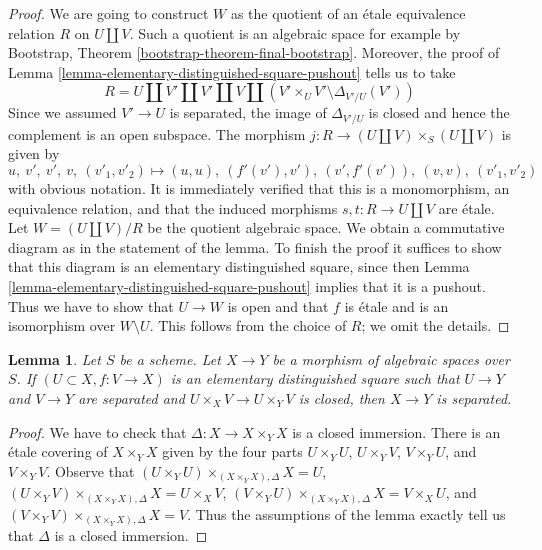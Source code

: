 \documentclass[10pt,a4paper]{amsart}
\theoremstyle{plain}
\newtheorem{lemma}[subsection]{Lemma}
\theoremstyle{definition}
\theoremstyle{remark}
\numberwithin{equation}{subsection}
\begin{document}
\begin{proof}
We are going to construct $W$ as the quotient of an \'etale
equivalence relation $R$ on $U \amalg V$. Such a quotient is an
algebraic space for example by
Bootstrap, Theorem \ref{bootstrap-theorem-final-bootstrap}.
Moreover, the proof of
Lemma \ref{lemma-elementary-distinguished-square-pushout} tells us to take
$$
R = U \amalg V' \amalg V' \amalg V \amalg
(V' \times_U V' \setminus \Delta_{V'/U}(V'))
$$
Since we assumed $V' \to U$ is separated, the image of
$\Delta_{V'/U}$ is closed and hence the complement is an
open subspace. The morphism $j : R \to (U \amalg V) \times_S (U \amalg V)$
is given by
$$
u,\ v',\ v',\ v,\ (v'_1, v'_2) \mapsto
(u, u),\ (f'(v'), v'),\ (v', f'(v')),\ (v, v),\ (v'_1, v'_2)
$$
with obvious notation. It is immediately verified that this is a
monomorphism, an equivalence relation, and that the induced morphisms
$s, t : R \to U \amalg V$ are \'etale. Let
$W = (U \amalg V)/R$ be the quotient algebraic space.
We obtain a commutative diagram as in the statement of the lemma.
To finish the proof it suffices to show that this diagram is
an elementary distinguished square, since then
Lemma \ref{lemma-elementary-distinguished-square-pushout}
implies that it is a pushout.
Thus we have to show that $U \to W$ is open and that
$f$ is \'etale and is an isomorphism over $W \setminus U$.
This follows from the choice of $R$; we omit the details.
\end{proof}

\begin{lemma}
\label{lemma-check-separated}
Let $S$ be a scheme. Let $X \to Y$ be a morphism of algebraic spaces over $S$.
If $(U \subset X, f : V \to X)$ is an elementary distinguished square
such that $U \to Y$ and $V \to Y$ are separated and
$U \times_X V \to U \times_Y V$ is closed, then $X \to Y$ is separated.
\end{lemma}

\begin{proof}
We have to check that $\Delta : X \to X \times_Y X$ is a closed immersion.
There is an \'etale covering of $X \times_Y X$ given by the four parts
$U \times_Y U$, $U \times_Y V$, $V \times_Y U$, and $V \times_Y V$.
Observe that
$(U \times_Y U) \times_{(X \times_Y X), \Delta} X  = U$,
$(U \times_Y V) \times_{(X \times_Y X), \Delta} X = U \times_X V$,
$(V \times_Y U) \times_{(X \times_Y X), \Delta} X = V \times_X U$, and
$(V \times_Y V) \times_{(X \times_Y X), \Delta} X = V$.
Thus the assumptions of the lemma
exactly tell us that $\Delta$ is a closed immersion.
\end{proof}
\end{document}
